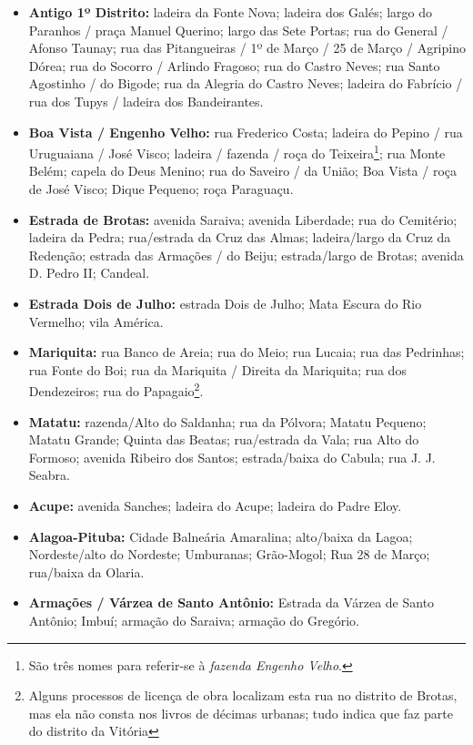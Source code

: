 \begin{itemize}
\item \textbf{Antigo 1º Distrito:} ladeira da Fonte Nova; ladeira dos Galés; largo do Paranhos / praça Manuel Querino; largo das Sete Portas; rua do General / Afonso Taunay; rua das Pitangueiras / 1º de Março / 25 de Março / Agripino Dórea;  rua do Socorro / Arlindo Fragoso; rua do Castro Neves; rua Santo Agostinho / do Bigode; rua da Alegria do Castro Neves; ladeira do Fabrício / rua dos Tupys / ladeira dos Bandeirantes.
\item \textbf{Boa Vista / Engenho Velho:} rua Frederico Costa; ladeira do Pepino / rua Uruguaiana / José Visco; ladeira / fazenda / roça do Teixeira\footnote{São três nomes para referir-se à \textit{fazenda Engenho Velho}.}; rua Monte Belém; capela do Deus Menino; rua do Saveiro / da União; Boa Vista / roça de José Visco; Dique Pequeno; roça Paraguaçu.
\item \textbf{Estrada de Brotas:} avenida Saraiva; avenida Liberdade; rua do Cemitério; ladeira da Pedra; rua/estrada da Cruz das Almas; ladeira/largo da Cruz da Redenção; estrada das Armações / do Beiju; estrada/largo de Brotas; avenida D. Pedro II; Candeal.
\item \textbf{Estrada Dois de Julho:} estrada Dois de Julho; Mata Escura do Rio Vermelho; vila América.
\item \textbf{Mariquita:} rua Banco de Areia; rua do Meio; rua Lucaia; rua das Pedrinhas; rua Fonte do Boi; rua da Mariquita / Direita da Mariquita; rua dos Dendezeiros; rua do Papagaio\footnote{Alguns processos de licença de obra localizam esta rua no distrito de Brotas, mas ela não consta nos livros de décimas urbanas; tudo indica que faz parte do distrito da Vitória}.
\item \textbf{Matatu:} razenda/Alto do Saldanha; rua da Pólvora; Matatu Pequeno; Matatu Grande; Quinta das Beatas; rua/estrada da Vala; rua Alto do Formoso; avenida Ribeiro dos Santos; estrada/baixa do Cabula; rua J. J. Seabra.
\item \textbf{Acupe:} avenida Sanches; ladeira do Acupe; ladeira do Padre Eloy.
\item \textbf{Alagoa-Pituba:} Cidade Balneária Amaralina; alto/baixa da Lagoa; Nordeste/alto do Nordeste; Umburanas; Grão-Mogol; Rua 28 de Março; rua/baixa da Olaria.
\item \textbf{Armações / Várzea de Santo Antônio:} Estrada da Várzea de Santo Antônio; Imbuí; armação do Saraiva; armação do Gregório.
\end{itemize}

